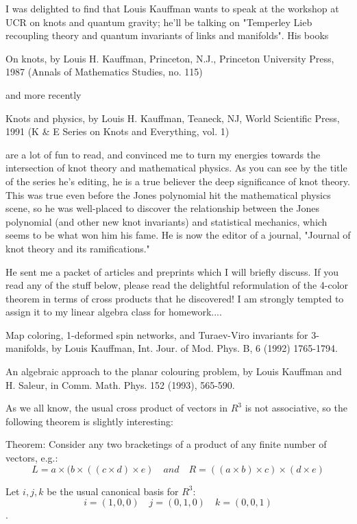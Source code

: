 I was delighted to find that Louis Kauffman wants to speak at the workshop at UCR on knots and quantum gravity; he'll be talking on "Temperley Lieb recoupling theory and quantum invariants of links and manifolds". His books

On knots, by Louis H. Kauffman, Princeton, N.J., Princeton University Press, 1987 (Annals of Mathematics Studies, no. 115)

and more recently

Knots and physics, by Louis H. Kauffman, Teaneck, NJ, World Scientific Press, 1991 (K & E Series on Knots and Everything, vol. 1)

are a lot of fun to read, and convinced me to turn my energies towards the intersection of knot theory and mathematical physics. As you can see by the title of the series he's editing, he is a true believer the deep significance of knot theory. This was true even before the Jones polynomial hit the mathematical physics scene, so he was well-placed to discover the relationship between the Jones polynomial (and other new knot invariants) and statistical mechanics, which seems to be what won him his fame. He is now the editor of a journal, "Journal of knot theory and its ramifications."

He sent me a packet of articles and preprints which I will briefly discuss. If you read any of the stuff below, please read the delightful reformulation of the 4-color theorem in terms of cross products that he discovered! I am strongly tempted to assign it to my linear algebra class for homework....


Map coloring, 1-deformed spin networks, and Turaev-Viro invariants for 3-manifolds, by Louis Kauffman, Int. Jour. of Mod. Phys. B, 6 (1992) 1765-1794.

An algebraic approach to the planar colouring problem, by Louis Kauffman and H. Saleur, in Comm. Math. Phys. 152 (1993), 565-590.

As we all know, the usual cross product of vectors in $R^3$ is not associative, so the following theorem is slightly interesting:

Theorem: Consider any two bracketings of a product of any finite number of vectors, e.g.: 
\[L = a \times (b \times ((c \times d) \times e)  \quad and \quad  R = ((a \times b) \times c) \times (d \times e)\]

Let $i,j,k$ be the usual canonical basis for $R^3$:
\[i = (1,0,0) \quad j = (0,1,0) \quad k = (0,0,1)\].

